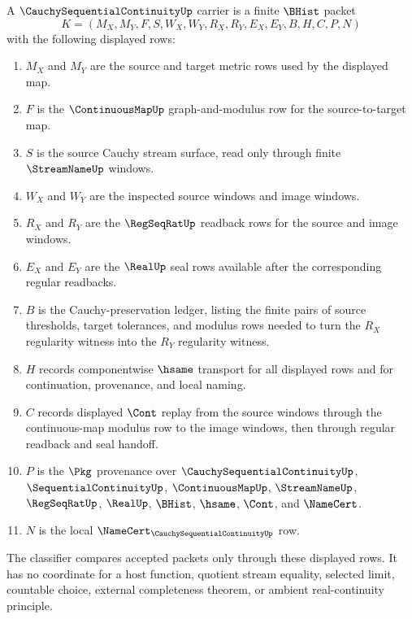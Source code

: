 \begin{definition}
\label{def:cauchy-sequential-continuity-carrier}
A $\CauchySequentialContinuityUp$ carrier is a finite $\BHist$ packet
$$
K=(M_X,M_Y,F,S,W_X,W_Y,R_X,R_Y,E_X,E_Y,B,H,C,P,N)
$$
with the following displayed rows:
\begin{enumerate}
\item $M_X$ and $M_Y$ are the source and target metric rows used by the displayed map.
\item $F$ is the $\ContinuousMapUp$ graph-and-modulus row for the source-to-target map.
\item $S$ is the source Cauchy stream surface, read only through finite $\StreamNameUp$ windows.
\item $W_X$ and $W_Y$ are the inspected source windows and image windows.
\item $R_X$ and $R_Y$ are the $\RegSeqRatUp$ readback rows for the source and image windows.
\item $E_X$ and $E_Y$ are the $\RealUp$ seal rows available after the corresponding regular readbacks.
\item $B$ is the Cauchy-preservation ledger, listing the finite pairs of source thresholds, target tolerances, and modulus rows needed to turn the $R_X$ regularity witness into the $R_Y$ regularity witness.
\item $H$ records componentwise $\hsame$ transport for all displayed rows and for continuation, provenance, and local naming.
\item $C$ records displayed $\Cont$ replay from the source windows through the continuous-map modulus row to the image windows, then through regular readback and seal handoff.
\item $P$ is the $\Pkg$ provenance over $\CauchySequentialContinuityUp$, $\SequentialContinuityUp$, $\ContinuousMapUp$, $\StreamNameUp$, $\RegSeqRatUp$, $\RealUp$, $\BHist$, $\hsame$, $\Cont$, and $\NameCert$.
\item $N$ is the local $\NameCert_{\CauchySequentialContinuityUp}$ row.
\end{enumerate}
The classifier compares accepted packets only through these displayed rows. It has no coordinate for a host function, quotient stream equality, selected limit, countable choice, external completeness theorem, or ambient real-continuity principle.
\end{definition}

